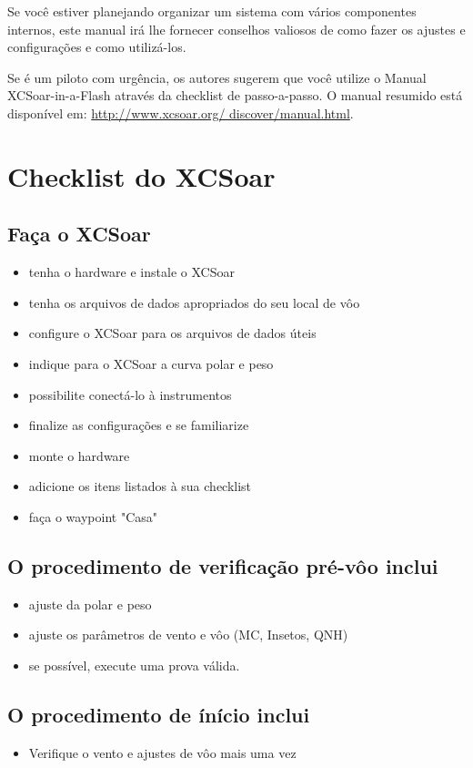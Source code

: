 Se você estiver planejando organizar um sistema com vários componentes internos, este manual irá lhe fornecer conselhos valiosos de como fazer os ajustes e configurações e como utilizá-los.

Se é um piloto com urgência, os autores sugerem que você utilize o Manual XCSoar-in-a-Flash através da checklist de passo-a-passo.  O manual resumido está disponível em: 
 \url{http://www.xcsoar.org/
discover/manual.html}.



\section{Checklist do XCSoar}

\subsection*{Faça o XCSoar}
\begin{itemize}
\item tenha o hardware e instale o XCSoar
\item tenha os arquivos de dados apropriados do seu local de vôo
\item configure o XCSoar para os arquivos de dados úteis
\item indique para o XCSoar a curva polar e peso
\item possibilite conectá-lo à instrumentos
\item finalize as configurações e se familiarize
\item monte o hardware
\item adicione os itens listados à sua checklist
\item faça o waypoint "Casa"
\end{itemize}

\subsection*{O procedimento de verificação pré-vôo inclui}
\begin{itemize}
\item ajuste da polar e peso
\item ajuste os parâmetros de vento e vôo (MC, Insetos, QNH)
\item se possível, execute uma prova válida.
\end{itemize}

\subsection*{O procedimento de ínício inclui}
\begin{itemize}
\item Verifique o vento e ajustes de vôo mais uma vez
\end{itemize}
\vspace{2em}

